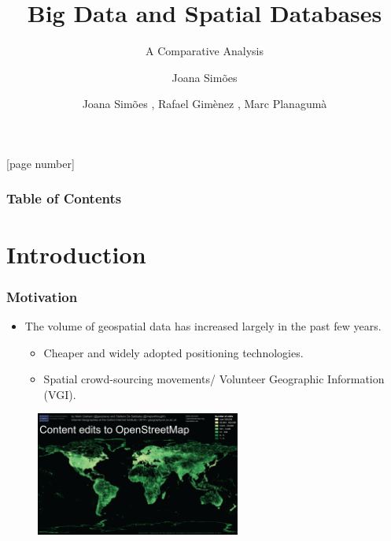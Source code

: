 \documentclass[hyperref={pdfpagelabels=true}]{beamer}
\title{Big Data and Spatial Databases}
\subtitle{A Comparative Analysis}
\author{Joana Sim\~{o}es}
\author[shortname]{Joana Sim\~{o}es \inst{1}, Rafael Gim\`{e}nez \inst{1}, Marc Planagum\`{a} \inst{1}}
\institute[shortinst]{\inst{1} Bdigital}
\begin{document}
[page number]
\begin{frame}
\titlepage


\end{frame} 

 
\begin{frame}
\frametitle{Table of Contents}
\tableofcontents%
\end{frame}

\section{Introduction} 
\begin{frame}
\frametitle{Motivation}
    \begin{itemize}
     \item<1->The volume of geospatial data has increased largely in the past few years.
    \begin{itemize}
      \item<2->Cheaper and widely adopted positioning technologies.
      \item<3->Spatial crowd-sourcing movements/ Volunteer Geographic Information (VGI).%
      \end{itemize}
    \end{itemize}        
    \begin{figure}       
	\includegraphics[width=0.6\textwidth]{osm.png}      
     \end{figure}      
\end{frame}
\end{document}
